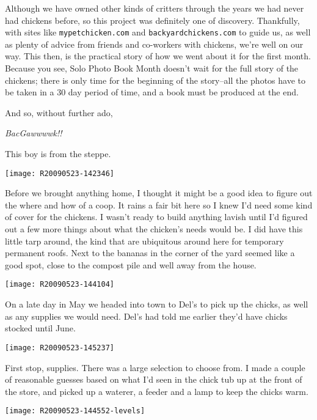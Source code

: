 Although we have owned other kinds of critters through the years we had
never had chickens before, so this project was definitely one of
discovery. 
Thankfully, with sites like {\tt mypetchicken.com} and 
{\tt backyardchickens.com} to
guide us, as well as plenty of advice from friends and co-workers with
chickens, we're well on our way. This then, is the practical story of
how we went about it for the first month. Because you see, Solo Photo
Book Month doesn't wait for the full story of the chickens; there is
only time for the beginning of the story--all the photos have to be taken
in a 30 day period of time, and a book must be produced at the end.

And so, without further ado, 

{\Large {\em BacGawwwwk!!}}
\newpage

\vspace*{3in}
\begin{center}
\Huge{This boy is from the steppe.}
\end{center}
\newpage

\pagestyle{plain}

\texttt{[image: R20090523-142346]}

Before we brought anything home, I thought it might be a good idea to
figure out the where and how of a coop. It rains a fair bit here so I
knew I'd need some kind of cover for the chickens. I wasn't ready to
build anything lavish until I'd figured out a few more things about what
the chicken's needs would be. I did have this little tarp around, the
kind that are ubiquitous around here for temporary permanent roofs. Next
to the bananas in the corner of the yard seemed like a good spot, close
to the compost pile and well away from the house. 
\newpage

\texttt{[image: R20090523-144104]}

On a late day in May we headed into town to Del's to pick up the chicks,
as well as any supplies we would need.  Del's had told me earlier they'd
have chicks stocked until June. 
\newpage

\texttt{[image: R20090523-145237]}

First stop, supplies.  There was a large selection to choose from.  I
made a couple of reasonable guesses based on what I'd seen in the chick
tub up at the front of the store, and picked up a waterer, a feeder and
a lamp to keep the chicks warm. 
\newpage

\texttt{[image: R20090523-144552-levels]}

